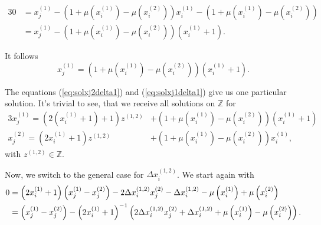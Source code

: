 \begin{alignat}{3}
	0 &= x_{j}^{\left(1\right)} - \left(1 + \mu\left(x_{i}^{\left(1\right)}\right) - \mu\left(x_{i}^{\left(2\right)}\right)\right)x_{i}^{\left(1\right)} - \left(1 + \mu\left(x_{i}^{\left(1\right)}\right) - \mu\left(x_{i}^{\left(2\right)}\right)\right) \label{eq:soldelta1_1} \\
	&= x_{j}^{\left(1\right)} - \left(1 + \mu\left(x_{i}^{\left(1\right)}\right) - \mu\left(x_{i}^{\left(2\right)}\right)\right)\left(x_{i}^{\left(1\right)} + 1\right) \label{eq:soldelta1_2}.
\end{alignat}

It follows
\begin{equation}
	x_{j}^{\left(1\right)} = \left(1 + \mu\left(x_{i}^{\left(1\right)}\right) - \mu\left(x_{i}^{\left(2\right)}\right)\right)\left(x_{i}^{\left(1\right)} + 1\right).
\label{eq:solxj1delta1}
\end{equation}

The equations (\ref{eq:solxj2delta1}) and (\ref{eq:solxj1delta1}) give us one particular solution. It's trivial to see, that we receive all solutions on $\mathbb{Z}$ for
\begin{alignat}{3}
	x_{j}^{\left(1\right)} = \left(2\left(x_{i}^{\left(1\right)} + 1\right) + 1\right)z^{\left(1,2\right)} &+ \left(1 + \mu\left(x_{i}^{\left(1\right)}\right) - \mu\left(x_{i}^{\left(2\right)}\right)\right)\left(x_{i}^{\left(1\right)} + 1\right) \label{eq:solxj1delta1_all} \\
	x_{j}^{\left(2\right)} = \left(2x_{i}^{\left(1\right)} + 1\right)z^{\left(1,2\right)} &+ \left(1 + \mu\left(x_{i}^{\left(1\right)}\right) - \mu\left(x_{i}^{\left(2\right)}\right)\right)x_{i}^{\left(1\right)} \label{eq:solxj2delta1_all},
\end{alignat}
with $z^{\left(1,2\right)} \in \mathbb{Z}$.

\vspace{0.3cm}
Now, we switch to the general case for $\Delta x_{i}^{\left(1,2\right)}$. We start again with
\begin{alignat}{3}
	0 &= \left(2x_{i}^{\left(1\right)} + 1\right)\left(x_{j}^{\left(1\right)} - x_{j}^{\left(2\right)}\right) - 2\Delta x_{i}^{\left(1,2\right)} x_{j}^{\left(2\right)} - \Delta x_{i}^{\left(1,2\right)} - \mu\left(x_{i}^{\left(1\right)}\right) + \mu\left(x_{i}^{\left(2\right)}\right) \notag \\
	& = \left(x_{j}^{\left(1\right)} - x_{j}^{\left(2\right)}\right) - \left(2x_{i}^{\left(1\right)} + 1\right)^{-1} \left(2\Delta x_{i}^{\left(1,2\right)}x_{j}^{\left(2\right)} + \Delta x_{i}^{\left(1,2\right)} + \mu\left(x_{i}^{\left(1\right)} \right) - \mu\left(x_{i}^{\left(2\right)}\right)\right). \label{eq:intersection2_caseDeltaxgen_s1}
\end{alignat}

